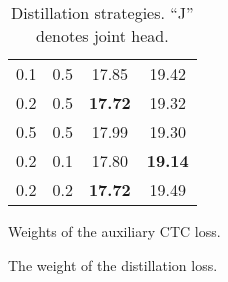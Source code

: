\documentclass{article}
\begin{document}
\begin{table}[t]
\begin{subtable}[b]{0.25\textwidth}
{\begin{tabular}{cc|cc}
    \midrule
    0.1 & 0.5 & 17.85 & 19.42 \\
    0.2 & 0.5 & \textbf{17.72} & 19.32 \\
    0.5 & 0.5 & 17.99 & 19.30 \\
    0.2 & 0.1 & 17.80 & \textbf{19.14} \\
    0.2 & 0.2 & \textbf{17.72} & 19.49 \\
    \bottomrule
    \end{tabular}}
    \caption{Weights of the auxiliary CTC loss.}
    \label{tab:lossw}
    \end{subtable}
    \hfill
    \begin{subtable}[b]{0.3\textwidth}
\centering
    \caption{The weight of the distillation loss.}
    \label{tab:weights_dist_loss}
    \end{subtable}
    \hfill
    \begin{subtable}[b]{0.4\textwidth}
    \centering
    \caption{Distillation strategies. ``J'' denotes joint head.}
    \label{tab:dist}
    \end{subtable}
\end{table}
\end{document}
